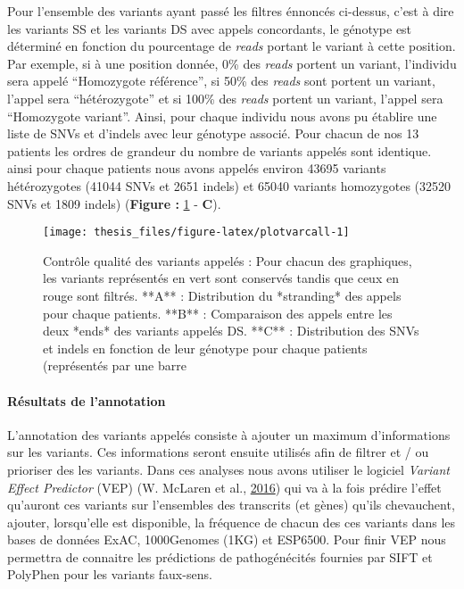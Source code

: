 \documentclass[12pt,twoside]{reedthesis}
\theoremstyle{definition}
\theoremstyle{definition}
\theoremstyle{remark}
\begin{document}
  Pour l'ensemble des variants ayant passé les filtres énnoncés ci-dessus,
  c'est à dire les variants SS et les variants DS avec appels concordants,
  le génotype est déterminé en fonction du pourcentage de \emph{reads}
  portant le variant à cette position. Par exemple, si à une position
  donnée, 0\% des \emph{reads} portent un variant, l'individu sera appelé
  ``Homozygote référence'', si 50\% des \emph{reads} sont portent un
  variant, l'appel sera ``hétérozygote'' et si 100\% des \emph{reads}
  portent un variant, l'appel sera ``Homozygote variant''. Ainsi, pour
  chaque individu nous avons pu établire une liste de SNVs et d'indels
  avec leur génotype associé. Pour chacun de nos 13 patients les ordres de
  grandeur du nombre de variants appelés sont identique. ainsi pour chaque
  patients nous avons appelés environ 43695 variants hétérozygotes (41044
  SNVs et 2651 indels) et 65040 variants homozygotes (32520 SNVs et 1809
  indels) (\textbf{Figure : }\ref{fig:plotvarcall} - \textbf{C}).
  
  \newpage
  
  \begin{figure}
  
  {\centering \texttt{[image: thesis\_files/figure-latex/plotvarcall-1]} 
  
  }
  
  \caption[Contrôle qualité des variants appelés]{Contrôle qualité des variants appelés : Pour chacun des graphiques, les variants représentés en vert sont conservés tandis que ceux en rouge sont filtrés. **A** : Distribution du *stranding* des appels pour chaque patients. **B** : Comparaison des appels entre les deux *ends* des variants appelés DS. **C** : Distribution des SNVs et indels en fonction de leur génotype pour chaque patients (représentés par une barre}\label{fig:plotvarcall}
  \end{figure}
  
  \newpage
  
  \paragraph{Résultats de l'annotation}\label{resultats-de-lannotation}
  
  L'annotation des variants appelés consiste à ajouter un maximum
  d'informations sur les variants. Ces informations seront ensuite
  utilisés afin de filtrer et / ou prioriser des les variants. Dans ces
  analyses nous avons utiliser le logiciel \emph{Variant Effect Predictor}
  (VEP) (W. McLaren et al., \protect\hyperlink{ref-McLaren2016}{2016}) qui
  va à la fois prédire l'effet qu'auront ces variants sur l'ensembles des
  transcrits (et gènes) qu'ils chevauchent, ajouter, lorsqu'elle est
  disponible, la fréquence de chacun des ces variants dans les bases de
  données ExAC, 1000Genomes (1KG) et ESP6500. Pour finir VEP nous
  permettra de connaitre les prédictions de pathogénécités fournies par
  SIFT et PolyPhen pour les variants faux-sens.
  
\end{document}
